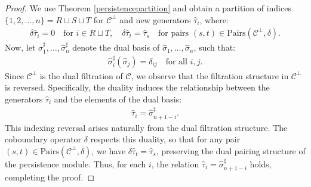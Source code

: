 \begin{proof}
We use Theorem \ref{persistencepartition} and obtain a partition of indices \( \{1, 2, \ldots, n\} = R \sqcup S \sqcup T \) for \( \mathcal{C}^\perp \) and new generators \( \hat{\tau}_i \), where:
\begin{align}
\delta \hat{\tau}_i = 0 \quad \text{for } i \in R \sqcup T, \quad \delta \hat{\tau}_t = \hat{\tau}_s \quad \text{for pairs } (s,t) \in \text{Pairs}(\mathcal{C}^\perp, \delta).
\end{align}
Now, let \( \hat{\sigma}_1^\sharp, \ldots, \hat{\sigma}_n^\sharp \) denote the dual basis of \( \hat{\sigma}_1, \ldots, \hat{\sigma}_n \), such that:
\begin{align}
\hat{\sigma}_i^\sharp(\hat{\sigma}_j) = \delta_{ij} \quad \text{for all } i,j.
\end{align}
Since \( \mathcal{C}^\perp \) is the dual filtration of \( \mathcal{C} \), we observe that the filtration structure in \( \mathcal{C}^\perp \) is reversed. Specifically, the duality induces the relationship between the generators \( \hat{\tau}_i \) and the elements of the dual basis:
\begin{align}
\hat{\tau}_i = \hat{\sigma}_{n+1-i}^\sharp.
\end{align}
This indexing reversal arises naturally from the dual filtration structure. The coboundary operator \( \delta \) respects this duality, so that for any pair \( (s,t) \in \text{Pairs}(\mathcal{C}^\perp, \delta) \), we have $\delta \hat{\tau}_t = \hat{\tau}_s$, preserving the dual pairing structure of the persistence module. Thus, for each \( i \), the relation \( \hat{\tau}_i = \hat{\sigma}_{n+1-i}^\sharp \) holds, completing the proof.
\end{proof}